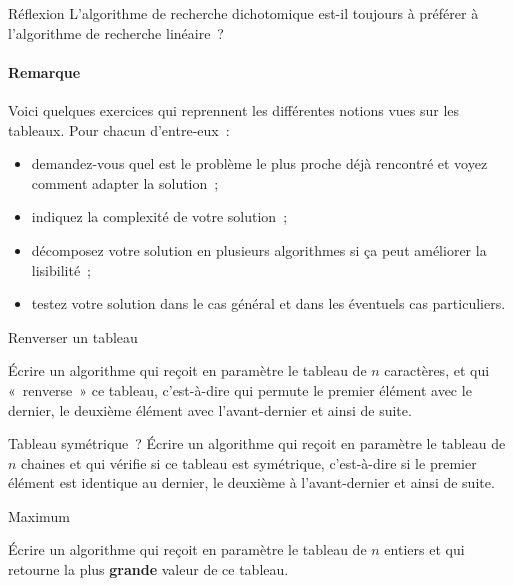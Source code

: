 	\begin{Exercice}{Réflexion}
		L’algorithme de recherche dichotomique 
		est-il toujours à préférer à
		l’algorithme de recherche linéaire~?
	\end{Exercice}

\bigskip
\bigskip
\begin{Emphase}
	\paragraph{Remarque}
	Voici quelques exercices
	qui reprennent les différentes notions vues sur les tableaux.
	Pour chacun d’entre-eux~:
	\begin{itemize}
	\item
		demandez-vous quel est le problème le plus proche déjà
		rencontré et voyez comment adapter la solution~;
	\item
		indiquez la complexité de votre solution~;
	\item
		décomposez votre solution en plusieurs algorithmes 
		si ça peut améliorer la lisibilité~;
	\item
		testez votre solution dans le cas général
		et dans les éventuels cas particuliers.
	\end{itemize}
\end{Emphase}
\bigskip
	
	\begin{Exercice}{Renverser un tableau}
		
		Écrire un algorithme qui reçoit en paramètre 
		le tableau  de $n$ caractères, 
		et qui «~renverse~» ce tableau, 
		c’est-à-dire qui permute le premier élément avec le dernier, 
		le deuxième élément avec l’avant-dernier et ainsi de suite.
	\end{Exercice}
	
	\begin{Exercice}{Tableau symétrique~?}
		Écrire un algorithme qui reçoit en paramètre 
		le tableau  de $n$ chaines 
		et qui vérifie si ce tableau est symétrique, 
		c’est-à-dire si le premier élément est identique au dernier, 
		le deuxième à l’avant-dernier et ainsi de suite.
	\end{Exercice}
		
	\begin{Exercice}{Maximum}
		
		Écrire un algorithme qui reçoit en paramètre le tableau
		 de $n$ entiers et qui
		retourne la plus \textbf{grande} valeur de ce tableau.
	\end{Exercice}
		
